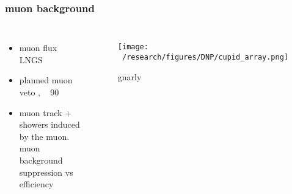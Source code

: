 \documentclass{beamer}
\begin{document}
	\begin{frame}
		\frametitle{muon background}
		\begin{columns}[c] %
			
			\begin{itemize}
				\item muon flux LNGS
				\item planned muon veto , ~ 90%
				\item muon track + showers induced by the muon. muon background suppression vs efficiency
			\end{itemize}
			
			\begin{figure}
			\texttt{[image: ~/research/figures/DNP/cupid\_array.png]}
			\caption{gnarly}
			\end{figure}
			
		\end{columns}
	\end{frame}


\end{document}
